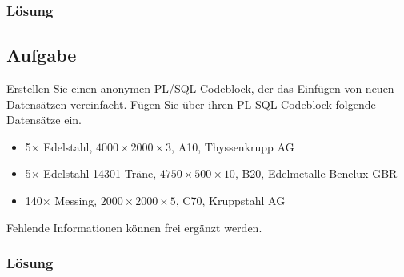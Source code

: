 \subsubsection*{Lösung}
\label{sec:uebung_06.aufgabe_03.loesung}


\subsection{Aufgabe}
\label{sec:uebung_06.aufgabe_04}
Erstellen Sie einen anonymen PL/SQL-Codeblock, der das Einfügen von neuen Datensätzen vereinfacht.
Fügen Sie über ihren PL-SQL-Codeblock folgende Datensätze ein.

\begin{itemize}[itemsep=0pt]
  \item 5$\times$ Edelstahl, $4000\times2000\times3$, A10, Thyssenkrupp AG
  \item 5$\times$ Edelstahl 14301 Träne, $4750\times500\times10$, B20, Edelmetalle Benelux GBR
  \item 140$\times$ Messing, $2000\times2000\times5$, C70, Kruppstahl AG
\end{itemize}

Fehlende Informationen können frei ergänzt werden.

\subsubsection*{Lösung}
\label{sec:uebung_06.aufgabe_04.loesung}
